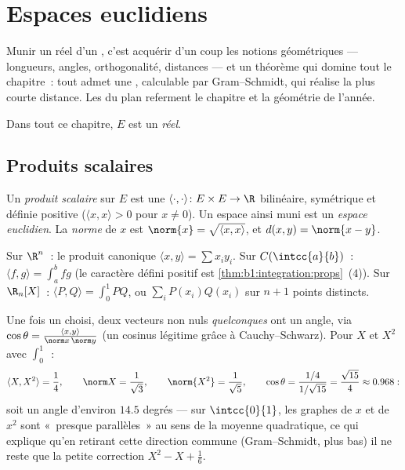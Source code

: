 \chapter{Espaces euclidiens}\label{ch:b1:euclid}

Munir un  réel d'un , c'est acquérir
d'un coup les notions géométriques --- longueurs, angles,
orthogonalité, distances --- et un théorème qui domine tout le
chapitre~: tout  admet une ,
calculable par Gram--Schmidt, qui réalise la plus courte distance.
Les  du plan referment le chapitre et la géométrie de
l'année.

Dans tout ce chapitre, $E$ est un  \emph{réel}.

\section{Produits scalaires}

\begin{definition}\label{def:b1:euclid:def}
Un \emph{produit scalaire} sur $E$ est une
 $\langle\cdot,\cdot\rangle \colon E \times E \to \R$
bilinéaire, symétrique et définie positive ($\langle x, x\rangle >
0$ pour $x \neq 0$). Un espace  ainsi muni est un
\emph{espace euclidien}. La \emph{norme} de
$x$ est $\norm{x} = \sqrt{\langle x, x\rangle}$, et $d(x, y) =
\norm{x - y}$.
\end{definition}

\begin{example}\label{ex:b1:euclid:examples}
Sur $\R^n$~: le produit canonique $\langle x, y\rangle = \sum x_i
y_i$. Sur $C(\intcc{a}{b})$~: $\langle f, g \rangle = \int_a^b fg$
(le caractère défini positif est \cref{thm:b1:integration:props}~(4)).
Sur $\R_n[X]$~: $\langle P, Q\rangle = \int_0^1 PQ$, ou $\sum_{i}
P(x_i)Q(x_i)$ sur $n+1$ points distincts.
\end{example}

\begin{example}
\label{ex:b1:euclid:polyangle}
Une fois un  choisi, deux vecteurs non nuls
\emph{quelconques} ont un angle, via $\cos\theta = \frac{\langle x,
y\rangle}{\norm x\,\norm y}$ (un cosinus légitime grâce à
Cauchy--Schwarz). Pour $X$ et $X^2$ avec $\int_0^1$~:
\[
\langle X, X^2\rangle = \frac14, \qquad
\norm X = \frac1{\sqrt3}, \qquad \norm{X^2} = \frac1{\sqrt5},
\qquad
\cos\theta = \frac{1/4}{1/\sqrt{15}} = \frac{\sqrt{15}}{4}
\approx 0.968 :
\]
soit un angle d'environ $14.5$ degrés --- sur $\intcc{0}{1}$, les
graphes de $x$ et de $x^2$ sont «~presque parallèles~» au sens de
la moyenne quadratique, ce qui explique qu'en retirant cette
direction commune (Gram--Schmidt, plus bas) il ne reste que la
petite correction $X^2 - X + \frac16$.
\end{example}

